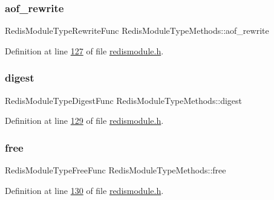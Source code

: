 \subsubsection{\texorpdfstring{aof\+\_\+rewrite}{aof\_rewrite}}
{\footnotesize\ttfamily Redis\+Module\+Type\+Rewrite\+Func Redis\+Module\+Type\+Methods\+::aof\+\_\+rewrite}



Definition at line \hyperlink{redismodule_8h_source_l00127}{127} of file \hyperlink{redismodule_8h_source}{redismodule.\+h}.

\mbox{\label{structRedisModuleTypeMethods_a421c9f70ffc3c81d4c4018dcce340ac4}} 
\subsubsection{\texorpdfstring{digest}{digest}}
{\footnotesize\ttfamily Redis\+Module\+Type\+Digest\+Func Redis\+Module\+Type\+Methods\+::digest}



Definition at line \hyperlink{redismodule_8h_source_l00129}{129} of file \hyperlink{redismodule_8h_source}{redismodule.\+h}.

\mbox{\label{structRedisModuleTypeMethods_a8ccb7d97db657d6b581df702b33681df}} 
\subsubsection{\texorpdfstring{free}{free}}
{\footnotesize\ttfamily Redis\+Module\+Type\+Free\+Func Redis\+Module\+Type\+Methods\+::free}



Definition at line \hyperlink{redismodule_8h_source_l00130}{130} of file \hyperlink{redismodule_8h_source}{redismodule.\+h}.

\mbox{\label{structRedisModuleTypeMethods_ade953bbc28d771768e1746544f04a0aa}} 
